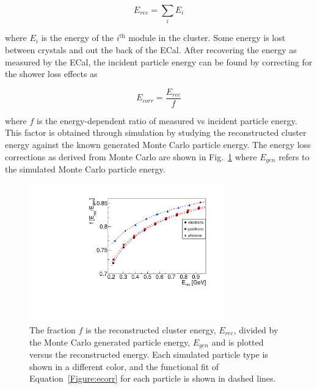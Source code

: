 \begin{equation}
\label{eq:eclsum}
E_{rec} = \sum_i E_i    
\end{equation}

where $E_i$ is the energy of the $i^{\textrm{th}}$ module in the cluster. Some energy is lost between crystals and out the back of the ECal. After recovering the energy as measured by the ECal, the incident particle energy can be found by correcting for the shower loss effects as  

\begin{equation}
\label{eq:eclsf}
E_{corr} = \dfrac{E_{rec}}{f}   
\end{equation}

where $f$ is the energy-dependent ratio of measured vs incident particle energy. This factor is obtained through simulation by studying the reconstructed cluster energy against the known generated Monte Carlo particle energy. The energy loss corrections as derived from Monte Carlo are shown in Fig.~\ref{Figure:ecorr} where $E_{gen}$ refers to the simulated Monte Carlo particle energy.

\begin{figure}[thb]
  \centering
      \includegraphics[width=0.75\textwidth]{pics/performance/energycorrection.pdf}
  \caption[ECal energy shower correction functions derived from simulation]{The fraction $f$ is the reconstructed cluster energy, $E_{rec}$, divided by the Monte Carlo generated particle energy, $E_{gen}$ and is plotted versus the reconstructed energy. Each simulated particle type is shown in a different color, and the functional fit of Equation~\eqref{Figure:ecorr} for each particle is shown in dashed lines.}
  \label{Figure:ecorr}
\end{figure}

